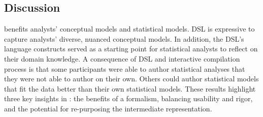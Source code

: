 \begin{comment}
\theme{Analysts want to use \rTisane iteratively.}
Participants described their typical analysis approach without rTisane as
iterative. During the study, this looked like visualizing the data [P6, 10,
11, 12], assessing correlations between variables [P6, P10] to pick variables
for an initial statistical model, or starting with ``a full model first and
then trim down and compare'' [P11]. In the scaffold condition, analysts engaged
with the connection between their conceptual and statistical models [P2, 5,
12]. For example, P5 refined her conceptual model prior to implementing a
statistical model: ``Conceptual model matters because it gives something to
start with...how all of them have impacts...after have done analysis, look at
R-sq and p-value to interpret significance of these predictors.'' P5 also
grappled with how to interpret the statistical modeling results in light of her
conceptual model, especially since she PICK Background or Prediction as reason.
viewed the purpose of analysis to be able to predict income: ``Really don’t see
how statistical analysis helps us with why…'' She also explained how even though
she had a conceptual model, she did not feel she had the appropriate
background:``[if she had] more of a social science...background knowledge that
we have to dig deeper.'' While P5 could have interpreted her statistical models
in light of the conceptual model she authored, her observation about background
is nevertheless indicative of….
\end{comment}


\subsection{Discussion}
\rTisane benefits analysts' conceptual models and statistical models. \rTisanes
DSL is expressive to capture analysts' diverse, nuanced conceptual models. In
addition, the DSL's language constructs served as a starting point
for statistical analysts to reflect on their domain knowledge. A consequence of
\rTisanes DSL and interactive compilation process is that some participants
were able to author statistical analyses that they were not able to author on
their own. Others could author statistical models that fit the data better than
their own statistical models. These results highlight three key insights in
\rTisane: the benefits of a formalism, balancing usability and rigor, and the
potential for re-purposing the intermediate representation. 

